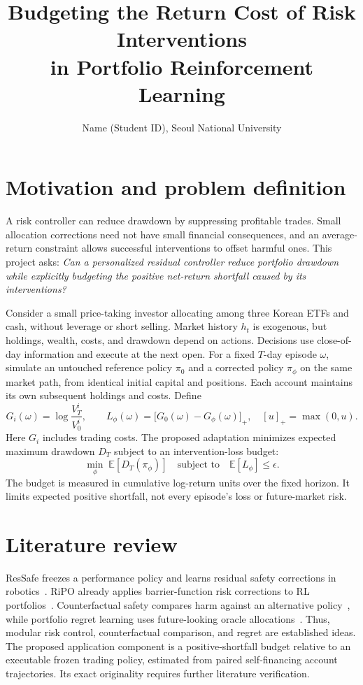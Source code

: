 \documentclass[10pt]{article}
\title{Budgeting the Return Cost of Risk Interventions\\in Portfolio Reinforcement Learning}
\author{Name (Student ID), Seoul National University}
\date{}
\begin{document}
\maketitle
\vspace{-1.5em}

\section{Motivation and problem definition}
A risk controller can reduce drawdown by suppressing profitable trades. Small allocation corrections need not have small financial consequences, and an average-return constraint allows successful interventions to offset harmful ones. This project asks: \emph{Can a personalized residual controller reduce portfolio drawdown while explicitly budgeting the positive net-return shortfall caused by its interventions?}

Consider a small price-taking investor allocating among three Korean ETFs and cash, without leverage or short selling. Market history $h_t$ is exogenous, but holdings, wealth, costs, and drawdown depend on actions. Decisions use close-of-day information and execute at the next open. For a fixed $T$-day episode $\omega$, simulate an untouched reference policy $\pi_0$ and a corrected policy $\pi_\phi$ on the same market path, from identical initial capital and positions. Each account maintains its own subsequent holdings and costs. Define
\begin{equation}
 G_i(\omega)=\log\frac{V^i_T}{V^i_0},\qquad
 L_\phi(\omega)=\bigl[G_0(\omega)-G_\phi(\omega)\bigr]_+,\quad [u]_+=\max(0,u).
\end{equation}
Here $G_i$ includes trading costs. The proposed adaptation minimizes expected maximum drawdown $D_T$ subject to an intervention-loss budget:
\begin{equation}
 \min_\phi\;\mathbb E[D_T(\pi_\phi)]
 \quad\text{subject to}\quad \mathbb E[L_\phi]\leq\epsilon.
\end{equation}
The budget is measured in cumulative log-return units over the fixed horizon. It limits expected positive shortfall, not every episode's loss or future-market risk.

\section{Literature review}
ResSafe freezes a performance policy and learns residual safety corrections in robotics~\cite{ressafe}. RiPO already applies barrier-function risk corrections to RL portfolios~\cite{ripo}. Counterfactual safety compares harm against an alternative policy~\cite{harm}, while portfolio regret learning uses future-looking oracle allocations~\cite{regret}. Thus, modular risk control, counterfactual comparison, and regret are established ideas. The proposed application component is a positive-shortfall budget relative to an executable frozen trading policy, estimated from paired self-financing account trajectories. Its exact originality requires further literature verification.
\end{document}
